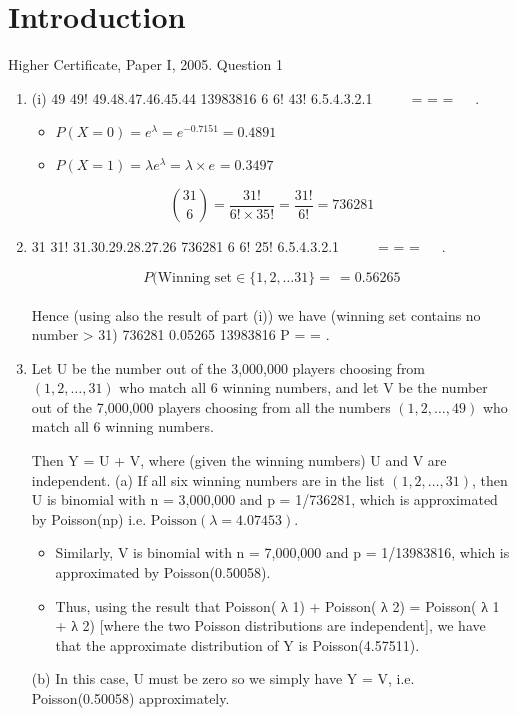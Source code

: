\documentclass[a4paper,12pt]{article}
\begin{document}
\section{Introduction}

Higher Certificate, Paper I, 2005. Question 1
\begin{enumerate}
\item (i)
49 49! 49.48.47.46.45.44 13983816
6 6! 43! 6.5.4.3.2.1
 
  = = =
 
.


\begin{itemize}
\item $P(X=0) = e^{\lambda} = e^{-0.7151} = 0.4891 $ 
\item $P(X=1) = \lambda e^{\lambda} = \lambda \times  e^{} = 0.3497 $ 
\end{itemize}

\[ { 31 \choose 6} = \frac{31!}{6! \times 35!}  = \frac{31!}{6!} = 736281\]


\item 
31 31! 31.30.29.28.27.26 736281
6 6! 25! 6.5.4.3.2.1
 
  = = =
 
.



\[ P(\mbox{Winning set} \in \{1,2,\ldots 31\} = \frac{}{} = 0.56265\]




Hence (using also the result of part (i)) we have
(winning set contains no number > 31) 736281 0.05265
13983816
P = = .
\item  Let U be the number out of the 3,000,000 players choosing from $(1, 2, \ldots, 31)$
who match all 6 winning numbers, and let V be the number out of the 7,000,000
players choosing from all the numbers $(1, 2,\ldots, 49)$ who match all 6 winning
numbers.

Then Y = U + V, where (given the winning numbers) U and V are independent.
(a) If all six winning numbers are in the list $(1, 2, \ldots, 31)$, then U is
binomial with n = 3,000,000 and p = 1/736281, which is approximated by
Poisson(np) i.e. $\mbox{Poisson} (\lambda = 4.07453)$.
\begin{itemize}
\item Similarly, V is binomial with n = 7,000,000 and p = 1/13983816, which is
approximated by Poisson(0.50058).
\item Thus, using the result that Poisson( λ
1) + Poisson( λ
2) = Poisson( λ
1 + λ
2)
[where the two Poisson distributions are independent], we have that the
approximate distribution of Y is Poisson(4.57511).
\end{itemize}
(b) In this case, U must be zero so we simply have Y = V, i.e.
Poisson(0.50058) approximately.
\end{enumerate}
\end{document}
